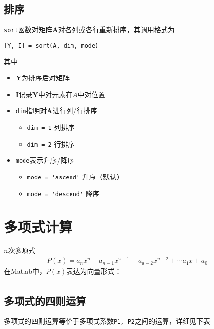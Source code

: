 \subsection{排序}
\lstinline|sort|函数对矩阵$\bm{A}$对各列或各行重新排序，其调用格式为
\begin{center}
	\lstinline|[Y, I] = sort(A, dim, mode)|
\end{center}
其中
\begin{itemize}
	\item $\bm{Y}$为排序后对矩阵
	\item $\bm{I}$记录$\bm{Y}$中对元素在$A$中对位置
	\item \lstinline|dim|指明对$\bm{A}$进行列/行排序
	\begin{itemize}
		\item \lstinline|dim = 1| \quad 列排序
		\item \lstinline|dim = 2| \quad 行排序
	\end{itemize}
	\item \lstinline|mode|表示升序/降序
	\begin{itemize}
		\item \lstinline|mode = 'ascend'| \quad 升序（默认）
		\item \lstinline|mode = 'descend'| \quad 降序
	\end{itemize}
\end{itemize}



\section{多项式计算}
$n$次多项式
\begin{align}
	P(x) = a_nx^n + a_{n-1}x^{n-1} + a_{n-2}x^{n-2} + \cdots a_1x + a_0
\end{align}
在Matlab中，$P(x)$表达为向量形式：
\begin{align}
	[a_n,a_{n-1},a_{n-2},\cdots,a_1,a_0]
\end{align}
\subsection{多项式的四则运算}
多项式的四则运算等价于多项式系数\lstinline|P1, P2|之间的运算，详细见下表
\begin{table}[!htb]
		\centering
\end{table}

